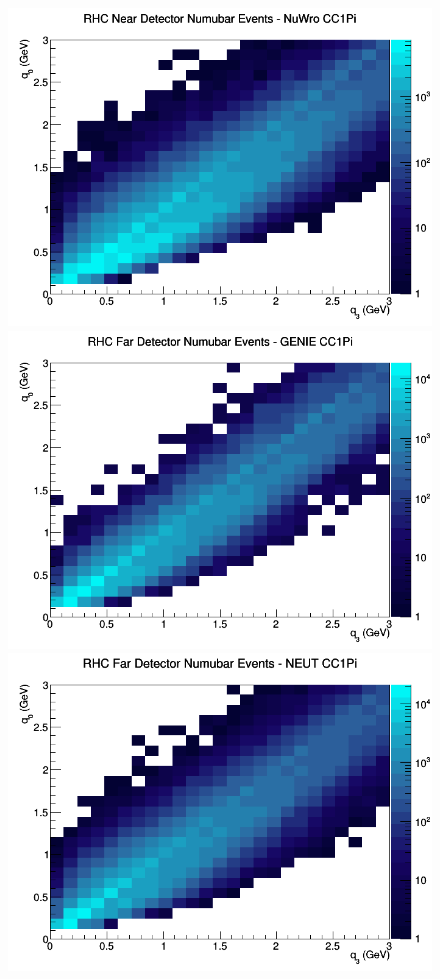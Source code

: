 \begin{figure}[h]
\includegraphics[width=\linewidth]{eff_q0_q3/LAr/CC1Pi_RHC_ND_numubar_q3_q0_NuWro.png}
\endminipage
\newline
{}
\includegraphics[width=\linewidth]{eff_q0_q3/LAr/CC1Pi_RHC_FD_numubar_q3_q0_GENIE.png}
\endminipage
{}
\includegraphics[width=\linewidth]{eff_q0_q3/LAr/CC1Pi_RHC_FD_numubar_q3_q0_NEUT.png}

\end{figure}
